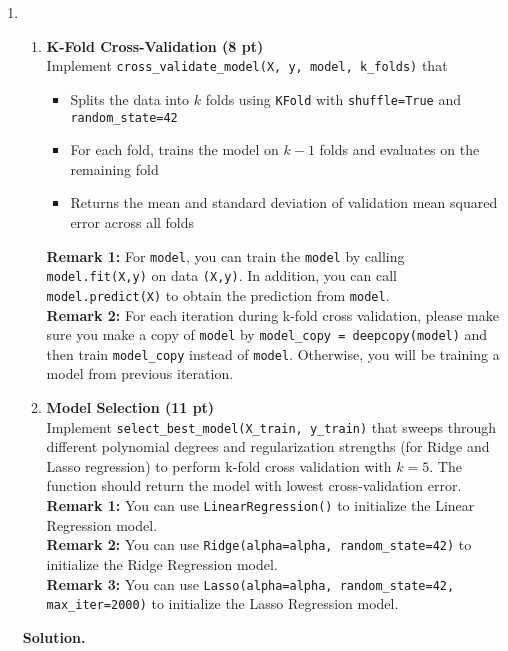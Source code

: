 \documentclass{article}
\theoremstyle{definition}
\theoremstyle{remark}
\newenvironment{Q}
    {%
      \clearpage
      \item
    }
    {%
      \phantom{s}
      \bigskip
      \textbf{Solution.}
    }
\begin{document}
\begin{enumerate}[font={\Large\bfseries},left=0pt]
\begin{Q}
\begin{enumerate}
    \item \textbf{K-Fold Cross-Validation (8 pt)}\\
    Implement \texttt{cross\_validate\_model(X, y, model, k\_folds)} that
    \begin{itemize}
        \item Splits the data into $k$ folds using \texttt{KFold} with \texttt{shuffle=True} and \texttt{random\_state=42}
        \item For each fold, trains the model on $k-1$ folds and evaluates on the remaining fold
        \item Returns the mean and standard deviation of validation mean squared error across all folds
    \end{itemize}
    \textbf{Remark 1:} For \texttt{model}, you can train the \texttt{model} by calling \texttt{model.fit(X,y)} on data \texttt{(X,y)}. In addition, you can call \texttt{model.predict(X)} to obtain the prediction from \texttt{model}. \\ 
    \textbf{Remark 2:} For each iteration during k-fold cross validation, please make sure you make a copy of \texttt{model} by \texttt{model\_copy = deepcopy(model)}  and then train \texttt{model\_copy} instead of \texttt{model}. Otherwise, you will be training a model from previous iteration.\\
    \item \textbf{Model Selection (11 pt)} \\
    Implement \texttt{select\_best\_model(X\_train, y\_train)} that sweeps through different polynomial degrees and regularization strengths (for Ridge and Lasso regression) to perform k-fold cross validation with $k=5$. The function should return the model with lowest cross-validation error. \\
    \textbf{Remark 1:} You can use \texttt{LinearRegression()} to initialize the Linear Regression model.\\
    \textbf{Remark 2:} You can use \texttt{Ridge(alpha=alpha, random\_state=42)} to initialize the Ridge Regression model. \\ 
    \textbf{Remark 3:} You can use \texttt{Lasso(alpha=alpha, random\_state=42, max\_iter=2000)} to initialize the Lasso Regression model. \\
    
\end{enumerate}

\end{Q}

   
    \end{enumerate}
\end{document}
